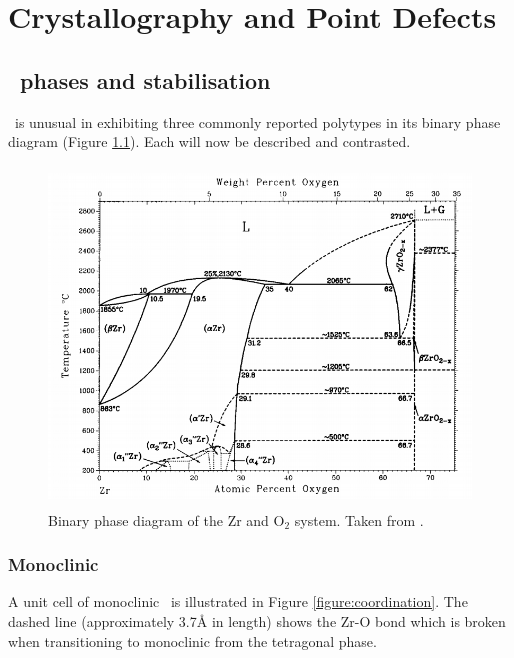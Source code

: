 \chapter{Crystallography and Point Defects}

\label{ch:crystallography}

\section{\zirconia\ phases and stabilisation}

\zirconia\ is unusual in exhibiting three commonly reported polytypes in its binary phase diagram (Figure \ref{figure:binary_phase_diagram}). Each will now be described and contrasted.

\begin{figure}[htp]
\centering
\includegraphics[height=9cm]{images/zro2_binary_phase.png}
\caption{Binary phase diagram of the Zr and O$_{2}$ system. Taken from \cite{Abriata1986TheSystem}.}
\label{figure:binary_phase_diagram}
\end{figure}

\subsection{Monoclinic}

A unit cell of monoclinic \zirconia\ is illustrated in Figure \ref{figure:coordination}. The dashed line (approximately 3.7\r{A} in length) shows the Zr-O bond which is broken when transitioning to monoclinic from the tetragonal phase.

